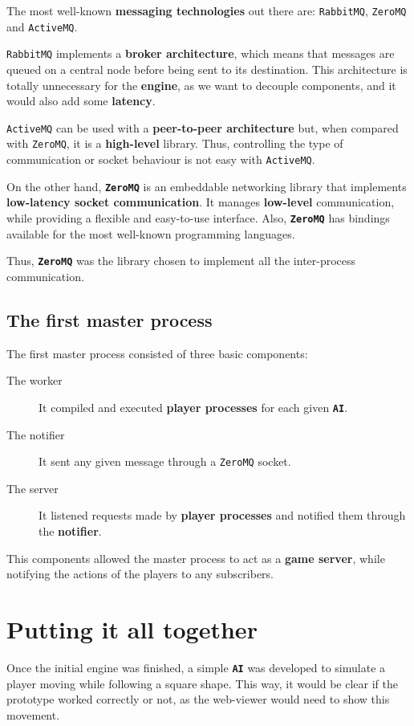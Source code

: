 \documentclass[a4paper,11pt,titlepage,abstract,numbers=noenddot,automark,mnsy,intlimits,rgb,dvipsnames]{report}
\begin{document}
The most well-known \textbf{messaging technologies} out there are: \texttt{RabbitMQ}, \texttt{ZeroMQ} and \texttt{ActiveMQ}.

\texttt{RabbitMQ} implements
a \textbf{broker architecture}, which means that messages are queued on a central node before being sent to its destination.
This architecture is totally unnecessary for the \textbf{engine}, as we want to decouple components, and it would also add
some \textbf{latency}.

\texttt{ActiveMQ} can be used with a \textbf{peer-to-peer architecture} but, when compared with \texttt{ZeroMQ}, it is a
\textbf{high-level} library. Thus, controlling the type of communication or socket behaviour is not easy with \texttt{ActiveMQ}.

On the other hand, \textbf{\texttt{ZeroMQ}} \cite{zeromq} is an embeddable networking library that implements
\textbf{low-latency socket communication}. It manages \textbf{low-level} communication, while providing a flexible and easy-to-use interface.
Also, \textbf{\texttt{ZeroMQ}} has bindings available for the most well-known programming languages.

Thus, \textbf{\texttt{ZeroMQ}} was the library chosen to implement all the inter-process communication.
\subsection{The first master process}
The first master process consisted of three basic components:
\begin{description}
\item[The worker]
It compiled and executed \textbf{player processes} for each given \textbf{\texttt{AI}}.
\item[The notifier]
It sent any given message through a \texttt{ZeroMQ} socket.
\item[The server]
It listened requests made by \textbf{player processes} and notified them through the \textbf{notifier}.
\end{description}
This components allowed the master process to act as a \textbf{game server}, while notifying the actions of the players to any
subscribers.
\section{Putting it all together}
Once the initial engine was finished, a simple \textbf{\texttt{AI}} was developed to simulate a player moving
while following a square shape. This way, it would be clear if the prototype worked correctly or not, as the web-viewer would need
to show this movement.
\end{document}
